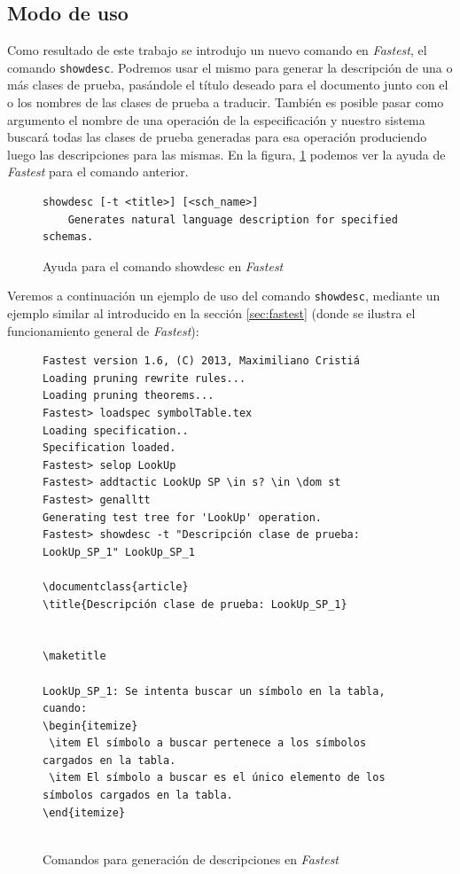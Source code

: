 \subsection{Modo de uso}

Como resultado de este trabajo se introdujo un nuevo comando en \textit{Fastest}, el comando \texttt{showdesc}. Podremos usar el mismo para generar la descripción de una o más clases de prueba, pasándole el título deseado para el documento junto con el o los nombres de las clases de prueba a traducir. También es posible pasar como argumento el nombre de una operación de la especificación y nuestro sistema buscará todas las clases de prueba generadas para esa operación produciendo luego las descripciones para las mismas. En la figura, \ref{ej:showdesc_fastest} podemos ver la ayuda de \textit{Fastest} para el comando anterior.

\begin{figure}[H]
\centering
\begin{Verbatim}[frame=single,fontsize=\scriptsize]
showdesc [-t <title>] [<sch_name>]
	Generates natural language description for specified schemas.
\end{Verbatim}
\caption{Ayuda para el comando showdesc en \emph{Fastest}}
\label{ej:showdesc_fastest}
\end{figure}

Veremos a continuación un ejemplo de uso del comando \texttt{showdesc}, mediante un ejemplo similar al introducido en la sección \ref{sec:fastest} (donde se ilustra el funcionamiento general de \textit{Fastest}):

\begin{figure}[H]
\centering
\begin{Verbatim}[frame=single,fontsize=\scriptsize]
Fastest version 1.6, (C) 2013, Maximiliano Cristiá
Loading pruning rewrite rules...
Loading pruning theorems...
Fastest> loadspec symbolTable.tex
Loading specification..
Specification loaded.
Fastest> selop LookUp
Fastest> addtactic LookUp SP \in s? \in \dom st      
Fastest> genalltt
Generating test tree for 'LookUp' operation.
Fastest> showdesc -t "Descripción clase de prueba: LookUp_SP_1" LookUp_SP_1 

\documentclass{article}
\title{Descripción clase de prueba: LookUp_SP_1}


\maketitle

LookUp_SP_1: Se intenta buscar un símbolo en la tabla, cuando:
\begin{itemize}
 \item El símbolo a buscar pertenece a los símbolos cargados en la tabla.
 \item El símbolo a buscar es el único elemento de los símbolos cargados en la tabla.
\end{itemize}


\end{Verbatim}
\caption{Comandos para generación de descripciones en \emph{Fastest}}
\label{ej:comandos_fastest_nlg}
\end{figure}



